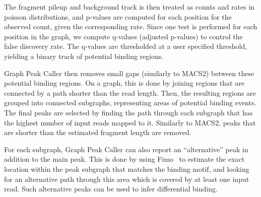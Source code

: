 \documentclass[10pt,letterpaper]{article}
\begin{document}
The fragment pileup and background track is then treated as counts and rates in poisson distributions, and p-values are computed for each position for the observed count, given the corresponding rate. Since one test is performed for each position in the graph, we compute q-values (adjusted p-values) to control the false discovery rate. The q-values are thresholded at a user specified threshold, yielding a binary track of potential binding regions. 

Graph Peak Caller then removes small gaps (similarly to MACS2) between these potential binding regions. On a graph, this is done by joining regions that are connected by a path shorter than the read length. Then, the resulting regions are grouped into connected subgraphs, representing areas of potential binding events. The final peaks are selected by finding the path through each subgraph that has the highest number of input reads mapped to it. Similarly to MACS2, peaks that are shorter than the estimated fragment length are removed. 

For each subgraph, Graph Peak Caller can also report an “alternative” peak in addition to the main peak. This is done by using Fimo~\cite{fimo} to estimate the exact location within the peak subgraph that matches the binding motif, and looking for an alternative path through this area which is covered by at least one input read. Such alternative peaks can be used to infer differential binding.
\end{document}
